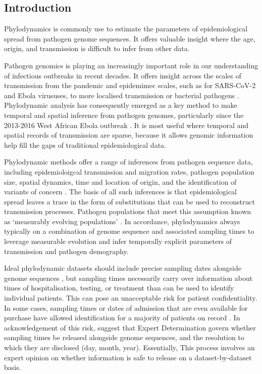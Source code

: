 \documentclass{article}
\begin{document}
\begin{spacing}{1.5}
\section*{Introduction}

Phylodynamics is commonly use to estimate the parameters of epidemiological spread from pathogen genome sequences. It offers valuable insight where the age, origin, and transmission is difficult to infer from other data. 


Pathogen genomics is playing an increasingly important role in our understanding of infectious outbreaks in recent decades. It offers insight across the scales of transmission from the pandemic and epidemimec scales, such as for SARS-CoV-2 and Ebola virususes, to more localised transmission or bacterial pathogens \citep{lancet2021genomic}. Phylodynamic analysis has consequently emerged as a key method to make temporal and spatial inference from pathogen genomes, particularly since the 2013-2016 West African Ebola outbreak \citep{mbala2019medical}. It is most useful where temporal and spatial records of transmission are sparse, because it allows genomic information help fill the gaps of traditional epidemiological data.

Phylodynamic methods offer a range of inferences from pathogen sequence data, including epidemioloigcal transmission and migration rates, pathogen population size, spatial dynamics, time and location of origin, and the identification of variants of concern \citep{featherstone2022epidemiological, attwood2022phylogenetic, du2015getting,volz_fitness_2023}. The basis of all such inferences is that epidemiological spread leaves a trace in the form of substitutions that can be used to reconstruct transmission processes. Pathogen populations that meet this assumption known as `measurably evolving populations' \citep{drummond2003measurably, biek_measurably_2015}. In accordance, phylodynamics always typically on a combination of genome sequence and associated sampling times to leverage measurable evolution and infer temporally explicit parameters of transmission and pathogen demography.

Ideal phylodynamic datasets should include precise sampling dates alongside genome sequences \citep{black2020ten}, but sampling times necessarily carry over information about times of hospitalisation, testing, or treatment than can be used to identify individual patients. This can pose an unacceptable risk for patient confidentiality. In some cases, sampling times or dates of admission that are even available for purchase have allowed identification for a majority of patients on record \citep{sweeney_matching_2013,shean_private_2018}. In acknowledgement of this risk, \citet{shean_private_2018} suggest that Expert Determination govern whether sampling times be released alongside genome sequences, and the resolution to which they are disclosed (day, month, year). Essentially, This process involves an expert opinion on whether information is safe to release on a dataset-by-dataset basis.


\end{spacing}
\end{document}
